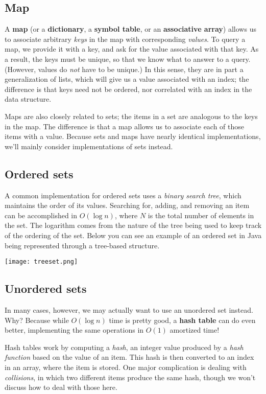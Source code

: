 \subsection{Map}

A \textbf{map} (or a \textbf{dictionary}, a \textbf{symbol table}, or an \textbf{associative array}) allows us to associate arbitrary \textit{keys} in the map with corresponding \textit{values}. To query a map, we provide it with a key, and ask for the value associated with that key. As a result, the keys must be unique, so that we know what to answer to a query. (However, values do \textit{not} have to be unique.) In this sense, they are in part a generalization of lists, which will give us a value associated with an index; the difference is that keys need not be ordered, nor correlated with an index in the data structure.

Maps are also closely related to sets; the items in a set are analogous to the keys in the map. The difference is that a map allows us to associate each of those items with a value. Because sets and maps have nearly identical implementations, we'll mainly consider implementations of sets instead.


\subsection{Ordered sets}

A common implementation for ordered sets uses a \textit{binary search tree}, which maintains the order of its values. Searching for, adding, and removing an item can be accomplished in $O(\log n)$, where $N$ is the total number of elements in the set. The logarithm comes from the nature of the tree being used to keep track of the ordering of the set. Below you can see an example of an ordered set in Java being represented through a tree-based structure.

\texttt{[image: treeset.png]}


\subsection{Unordered sets}

In many cases, however, we may actually want to use an unordered set instead. Why? Because while $O(\log n)$ time is pretty good, a \textbf{hash table} can do even better, implementing the same operations in $O(1)$ amortized time!

Hash tables work by computing a \textit{hash}, an integer value produced by a \textit{hash function} based on the value of an item. This hash is then converted to an index in an array, where the item is stored. One major complication is dealing with \textit{collisions}, in which two different items produce the same hash, though we won't discuss how to deal with those here.

